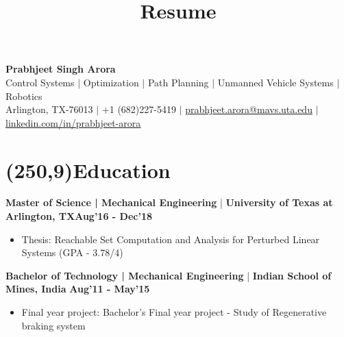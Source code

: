 \documentclass[10pt,a4paper]{extarticle}
\title{Resume}
\newcommand{\changeurlcolor}[1]{\hypersetup{urlcolor=#1}}
\begin{document}
\begin{center}
\textbf{\huge {Prabhjeet Singh Arora}}\\
\small{Control Systems $|$ Optimization $|$ Path Planning $|$ Unmanned Vehicle Systems $|$ Robotics}\\
\small{Arlington, TX-76013 $|$ +1 (682)227-5419 $|$ \href{prabhjeet.arora@mavs.uta.edu}{\ul{prabhjeet.arora@mavs.uta.edu}} $|$ \changeurlcolor{cyan}\href{http://www.linkedin.com/in/prabhjeet-arora}{\ul{linkedin.com/in/prabhjeet-arora}}}
\end{center}

\section*{\colorbox{gray!10}{\makebox(250,9){\textcolor{blue!65}{Education\hfill}}}}
\textbf{Master of Science | Mechanical Engineering} | \textbf{University of Texas at Arlington, TX}\hfill\textbf{Aug'16 - Dec'18}
\vspace{-0.5em}
\begin{itemize}[leftmargin = 0.6cm]
\setlength\itemsep{-0.2em}
\item Thesis: Reachable Set Computation and Analysis for Perturbed Linear Systems \hfill(GPA - 3.78/4) 
\end{itemize}
\textbf{Bachelor of Technology | Mechanical Engineering} | \textbf{Indian School of Mines, India} \hfill\textbf{Aug'11 - May'15}
\vspace{-0.5em}
\begin{itemize}[leftmargin = 0.6cm]
\setlength\itemsep{-0.2em}
\item Final year project: Bachelor's Final year project - Study of Regenerative braking system
\end{itemize}


\vspace{-0.2cm}
\end{document}
